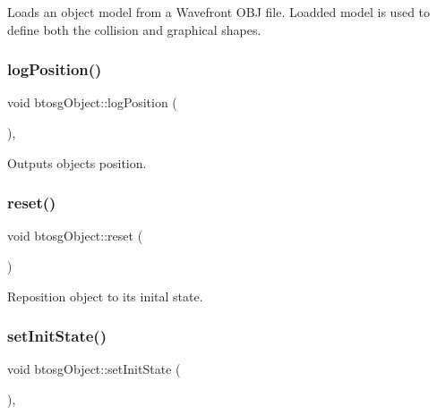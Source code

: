 Loads an object model from a Wavefront O\+BJ file. Loadded model is used to define both the collision and graphical shapes. \mbox{\label{classbtosgObject_acfd70fa6477c80fd7f29ad7ab9f4f067}} 
\subsubsection{\texorpdfstring{logPosition()}{logPosition()}}
{\footnotesize\ttfamily void btosg\+Object\+::log\+Position (\begin{DoxyParamCaption}{ }\end{DoxyParamCaption})\hspace{0.3cm}{\ttfamily [inline]}, {\ttfamily [inherited]}}

Outputs object\textquotesingle{}s position. \mbox{\label{classbtosgObject_a93983f9180dd0672f8779cf2baa78580}} 
\subsubsection{\texorpdfstring{reset()}{reset()}}
{\footnotesize\ttfamily void btosg\+Object\+::reset (\begin{DoxyParamCaption}{ }\end{DoxyParamCaption})\hspace{0.3cm}{\ttfamily [inherited]}}

Reposition object to its inital state. \mbox{\label{classbtosgObject_ad1508a0ce28cfac83e5f0ff6245f91b5}} 
\subsubsection{\texorpdfstring{setInitState()}{setInitState()}\hspace{0.1cm}{\footnotesize\ttfamily [1/2]}}
{\footnotesize\ttfamily void btosg\+Object\+::set\+Init\+State (\begin{DoxyParamCaption}{ }\end{DoxyParamCaption})\hspace{0.3cm}{\ttfamily [inline]}, {\ttfamily [inherited]}}

